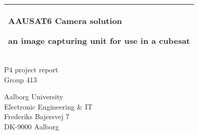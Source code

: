 %
\begin{titlepage}
  \addtolength{\hoffset}{0.5\evensidemargin-0.5\oddsidemargin} %
  \noindent%
  \begin{tabular}{@{}p{\textwidth}@{}}
    \toprule[2pt]
    \midrule
    \vspace{0.2cm}
    \begin{center}
    \Huge{\textbf{
      AAUSAT6 Camera solution %
    }}
    \end{center}
    \begin{center}
      \Large{
      an image capturing unit for use in a cubesat
      }
    \end{center}
    \vspace{0.2cm}\\
    \midrule
    \toprule[2pt]
  \end{tabular}
   \vspace{0.55 cm}
  \begin{figure}[!ht]
\centering
\label{fig:forside}
\end{figure}
  \vspace{-0.35 cm}
  \begin{center}
    {\large
      P4 project report %
    }\\
    \vspace{0.2cm}
    {\Large
      Group 413%
    }
  \end{center}
  \begin{center}
  Aalborg University\\
  Electronic Engineering \& IT\\
  Frederiks Bajersvej 7\\
  DK-9000 Aalborg
  \end{center}
\end{titlepage}

\clearpage